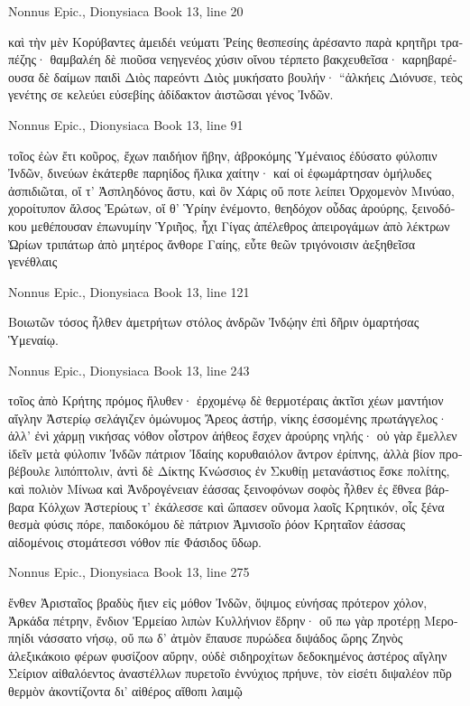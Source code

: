 \documentclass[12pt,letterpaper,twoside,final]{memoir}
\begin{document}
\begin{greek}
Nonnus Epic., Dionysiaca 
Book 13, line 20

καὶ τὴν μὲν Κορύβαντες ἀμειδέι νεύματι Ῥείης 
θεσπεσίης ἀρέσαντο παρὰ κρητῆρι τραπέζης· 
θαμβαλέη δὲ πιοῦσα νεηγενέος χύσιν οἴνου 
τέρπετο βακχευθεῖσα· καρηβαρέουσα δὲ δαίμων 
παιδὶ Διὸς παρεόντι Διὸς μυκήσατο βουλήν· 
 “ἀλκήεις Διόνυσε, τεὸς γενέτης σε κελεύει   
εὐσεβίης ἀδίδακτον ἀιστῶσαι γένος Ἰνδῶν. 



Nonnus Epic., Dionysiaca 
Book 13, line 91

τοῖος ἐὼν ἔτι κοῦρος, ἔχων παιδήιον ἥβην, 
ἁβροκόμης Ὑμέναιος ἐδύσατο φύλοπιν Ἰνδῶν, 
δινεύων ἑκάτερθε παρηίδος ἥλικα χαίτην· 
καί οἱ ἐφωμάρτησαν ὁμήλυδες ἀσπιδιῶται, 
οἵ τ' Ἀσπληδόνος ἄστυ, καὶ ὃν Χάρις οὔ ποτε λείπει 
Ὀρχομενὸν Μινύαο, χοροίτυπον ἄλσος Ἐρώτων, 
οἵ θ' Ὑρίην ἐνέμοντο, θεηδόχον οὖδας ἀρούρης, 
ξεινοδόκου μεθέπουσαν ἐπωνυμίην Ὑριῆος, 
ἧχι Γίγας ἀπέλεθρος ἀπειρογάμων ἀπὸ λέκτρων   
Ὠρίων τριπάτωρ ἀπὸ μητέρος ἄνθορε Γαίης, 
εὖτε θεῶν τριγόνοισιν ἀεξηθεῖσα γενέθλαις 




Nonnus Epic., Dionysiaca 
Book 13, line 121

Βοιωτῶν τόσος ἦλθεν ἀμετρήτων στόλος ἀνδρῶν 
Ἰνδῴην ἐπὶ δῆριν ὁμαρτήσας Ὑμεναίῳ. 



Nonnus Epic., Dionysiaca 
Book 13, line 243


τοῖος ἀπὸ Κρήτης πρόμος ἤλυθεν· ἐρχομένῳ δὲ 
θερμοτέραις ἀκτῖσι χέων μαντήιον αἴγλην 
Ἀστερίῳ σελάγιζεν ὁμώνυμος Ἄρεος ἀστήρ, 
νίκης ἐσσομένης πρωτάγγελος· ἀλλ' ἐνὶ χάρμῃ   
νικήσας νόθον οἶστρον ἀήθεος ἔσχεν ἀρούρης 
νηλής· οὐ γὰρ ἔμελλεν ἰδεῖν μετὰ φύλοπιν Ἰνδῶν 
πάτριον Ἰδαίης κορυθαιόλον ἄντρον ἐρίπνης, 
ἀλλὰ βίον προβέβουλε λιπόπτολιν, ἀντὶ δὲ Δίκτης 
Κνώσσιος ἐν Σκυθίῃ μετανάστιος ἔσκε πολίτης, 
καὶ πολιὸν Μίνωα καὶ Ἀνδρογένειαν ἐάσσας 
ξεινοφόνων σοφὸς ἦλθεν ἐς ἔθνεα βάρβαρα Κόλχων 
Ἀστερίους τ' ἐκάλεσσε καὶ ὤπασεν οὔνομα λαοῖς 
Κρητικόν, οἷς ξένα θεσμὰ φύσις πόρε, παιδοκόμου δὲ 
πάτριον Ἀμνισοῖο ῥόον Κρηταῖον ἐάσσας 
αἰδομένοις στομάτεσσι νόθον πίε Φάσιδος ὕδωρ. 



Nonnus Epic., Dionysiaca 
Book 13, line 275

ἔνθεν Ἀρισταῖος βραδὺς ἤιεν εἰς μόθον Ἰνδῶν, 
ὄψιμος εὐνήσας πρότερον χόλον, Ἀρκάδα πέτρην, 
ἔνδιον Ἑρμείαο λιπὼν Κυλλήνιον ἕδρην· 
οὔ πω γὰρ προτέρῃ Μεροπηίδι νάσσατο νήσῳ,   
οὔ πω δ' ἀτμὸν ἔπαυσε πυρώδεα διψάδος ὥρης 
Ζηνὸς ἀλεξικάκοιο φέρων φυσίζοον αὔρην, 
οὐδὲ σιδηροχίτων δεδοκημένος ἀστέρος αἴγλην 
Σείριον αἰθαλόεντος ἀναστέλλων πυρετοῖο 
ἐννύχιος πρήυνε, τὸν εἰσέτι διψαλέον πῦρ 
θερμὸν ἀκοντίζοντα δι' αἰθέρος αἴθοπι λαιμῷ 





\end{greek}
\end{document}
